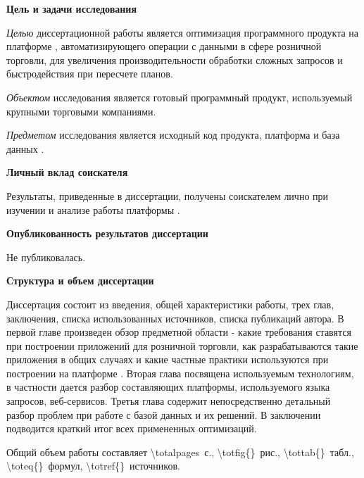 
\textbf{Цель и задачи исследования}

\emph{Целью} диссертационной работы является  оптимизация программного продукта на платформе \LB, автоматизирующего операции с данными в сфере розничной торговли, для увеличения производительности обработки сложных запросов и быстродействия при пересчете планов.

\emph{Объектом} исследования является готовый программный продукт, используемый крупными торговыми компаниями.

\emph{Предметом} исследования является исходный код продукта, платформа и база данных \LB.



\textbf{Личный вклад соискателя}

Результаты, приведенные в диссертации, получены соискателем лично при изучении и анализе работы платформы \LB.


\textbf{Опубликованность результатов диссертации}

Не публиковалась.

\textbf{Структура и объем диссертации}

Диссертация состоит из введения, общей характеристики работы, трех глав, заключения, списка использованных источников, списка публикаций автора. В первой главе произведен обзор предметной области - какие требования ставятся при построении приложений для розничной торговли, как разрабатываются такие приложения в общих случаях и какие частные практики используются при построении на платформе \LB. Вторая глава посвящена используемым технологиям, в частности дается разбор составляющих платформы, используемого языка запросов, веб-сервисов. Третья глава содержит непосредственно детальный разбор проблем при работе с базой данных и их решений. В заключении подводится краткий итог всех примененных оптимизаций.


Общий объем работы составляет \num{\totalpages}~с., \num{\totfig{}}~рис., \num{\tottab{}}~табл., \num{\toteq{}}~формул, \num{\totref{}}~источников.

